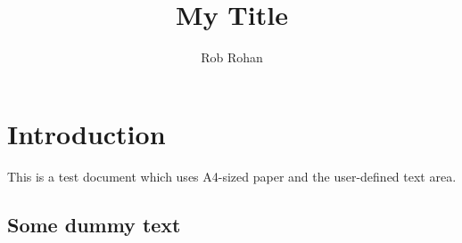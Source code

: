 \documentclass{article}
\author{Rob Rohan}
\title{My Title}
\begin{document}
	\maketitle

	\section{Introduction}
	This is a test document which uses A4-sized paper and the user-defined text area.
	\subsection{Some dummy text}
	\blindtext[8]
\end{document}

